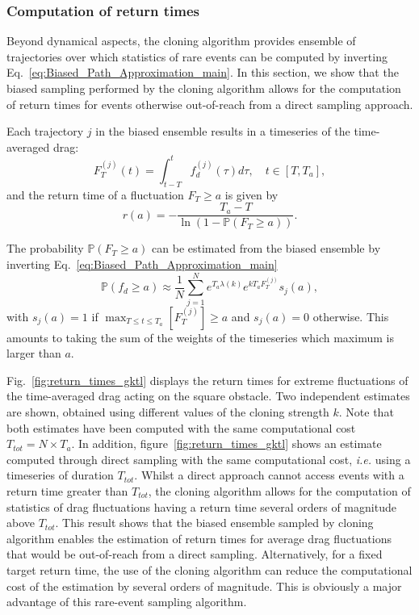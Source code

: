 \subsubsection{Computation of return times}
\label{sec:return_times}

Beyond dynamical aspects, the cloning algorithm provides ensemble of trajectories over which statistics of rare events can be computed by inverting Eq.~\eqref{eq:Biased_Path_Approximation_main}.
In this section, we show that the biased sampling performed by the cloning algorithm allows for the computation of return times for events otherwise out-of-reach from a direct sampling approach.

Each trajectory $j$ in the biased ensemble results in a timeseries of the time-averaged drag:
\begin{equation}
\label{eq:time_averaged}
F_T^{(j)}(t) = \int_{t-T}^{t}f_d^{(j)}(\tau)d\tau, \quad t\in [T,T_a]  ,
\end{equation}
and the return time of a fluctuation $F_T \geq a$ is given by~\citep{lestang_computing_2018}
\begin{equation}
r(a) = - \frac{T_a - T}{\ln (1-\mathbb{P}(F_T \geq a))}.
\end{equation}


The probability $\mathbb{P}(F_T \geq a)$ can be estimated from the biased ensemble by inverting Eq.~\eqref{eq:Biased_Path_Approximation_main}
\begin{equation}
  \mathbb{P}(f_d \geq a) \approx \frac{1}{N}\sum_{j=1}^{N}e^{T_a \lambda(k)}e^{kT_aF_T^{(j)}}s_j(a),
\end{equation}
with $s_j(a) = 1$ if $\max_{T\leq t \leq T_a}[F_T^{(j)}] \geq a$ and $s_j(a) = 0$ otherwise. This amounts to taking the sum of the weights of the timeseries which maximum is larger than $a$.

Fig.~\ref{fig:return_times_gktl} displays the return times for extreme fluctuations of the time-averaged drag acting on the square obstacle.
Two independent estimates are shown, obtained using different values of the cloning strength $k$.
Note that both estimates have been computed with the same computational cost $T_{tot}=N\times T_a$.
In addition, figure~\ref{fig:return_times_gktl} shows an estimate computed through direct sampling with the same computational cost, \textit{i.e.} using a timeseries of duration $T_{tot}$.
Whilst a direct approach cannot access events with a return time greater than $T_{tot}$, the cloning algorithm allows for the computation of statistics of drag fluctuations having a return time several orders of magnitude above $T_{tot}$.
This result shows that the biased ensemble sampled by cloning algorithm enables the estimation of return times for average drag fluctuations that would be out-of-reach from a direct sampling.
Alternatively, for a fixed target return time, the use of the cloning algorithm can reduce the computational cost of the estimation by several orders of magnitude.
This is obviously a major advantage of this rare-event sampling algorithm.

